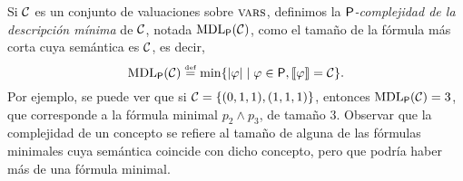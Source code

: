 Si $\mathcal{C}$ es un conjunto de valuaciones sobre $\textsc{vars}$, definimos la {\em ${\sf P}$-complejidad de la descripción mínima} de $\mathcal{C}$, notada ${\rm MDL}_{{\sf P}}(\mathcal{C})$, como el tamaño de la fórmula más corta cuya semántica es $\mathcal{C}$, es decir,
$$
{\rm MDL}_{{\sf P}}(\mathcal{C})\stackrel{\scriptscriptstyle \mathrm{def}}{=}\min\{|\varphi|\mid \varphi\in{\sf P},\llbracket \varphi\rrbracket=\mathcal{C}\}.
$$
Por ejemplo, se puede ver que si $\mathcal{C}=\{(0,1,1), (1,1,1)\}$, entonces ${\rm MDL}_{{\sf P}}(\mathcal{C})=3$, que corresponde a la fórmula minimal $p_2\wedge p_3$, de tamaño 3. Observar que la complejidad de un concepto se refiere al tamaño de alguna de las fórmulas minimales cuya semántica coincide con dicho concepto, pero que podría haber más de una fórmula minimal.


    
    
\renewcommand{\thetable}{\arabic{chapter}.\arabic{figure}}
\renewcommand{\thefigure}{\arabic{chapter}.\arabic{figure}}    




